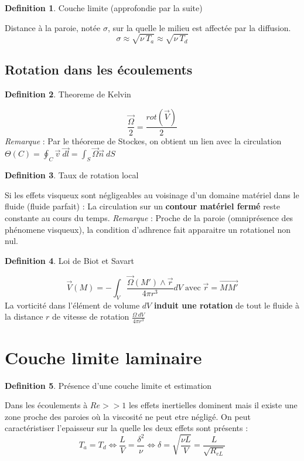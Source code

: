 \documentclass[french]{article}
\theoremstyle{definition}
\newtheorem{definition}{Definition}[section]
\begin{document}
\begin{definition} Couche limite (approfondie par la suite) \par
	Distance à la paroie, notée $\sigma$, sur la quelle le milieu est affectée par la diffusion. 
	$$ \sigma \approx \sqrt{\nu \ T_a } \approx \sqrt{\nu \ T_d }$$ 
\end{definition}


\subsection{Rotation dans les écoulements}

\begin{definition} Theoreme de Kelvin \par
	$$ \frac{\vec{\Omega}}{2} = \frac{rot(\vec{V})}{2} $$
	\textit{Remarque} : Par le théoreme de Stockes, on obtient un lien avec la circulation
	$ \Theta(C) = \oint_C \vec{v} \ \vec{dl} = \int_S \vec{\Omega} \vec{n} \ dS$
\end{definition}


\begin{definition} Taux de rotation local \par
	Si les effets visqueux sont négligeables au voisinage d'un domaine matériel dans le fluide (fluide parfait) :
	La circulation sur un \textbf{contour matériel fermé} reste constante au cours du temps.
	\textit{Remarque} : Proche de la paroie (omniprésence des phénomene visqueux), la condition d'adhrence fait apparaitre un rotationel non nul.
\end{definition}

\begin{definition} Loi de Biot et Savart \par
	$$ \vec{V}(M) = - \int_V \frac{\vec{\Omega}(M') \wedge \vec{r}}{4 \pi r^3} dV \; \mbox{avec} \; \vec{r} = \vec{MM'} $$
	La vorticité dans l'élément de volume $dV$ \textbf{induit une rotation} de tout le fluide à la distance $r$ de vitesse de rotation $ \frac{\Omega \ dV}{4\pi r^3}$
\end{definition}

\section{Couche limite laminaire}

\begin{definition} Présence d'une couche limite et estimation \par
	Dans les écoulements à $Re >> 1$ les effets inertielles dominent mais il existe une zone proche des paroies où la viscosité ne peut etre négligé. On peut caractéristiser l'epaisseur sur la quelle les deux effets sont présents :
	$$ T_a = T_d \Leftrightarrow \frac{L}{V} = \frac{\delta^2}{\nu} \Leftrightarrow \delta = \sqrt{\frac{\nu L}{V}} = \frac{L}{\sqrt{R_{eL}}} $$
\end{definition}
\end{document}
